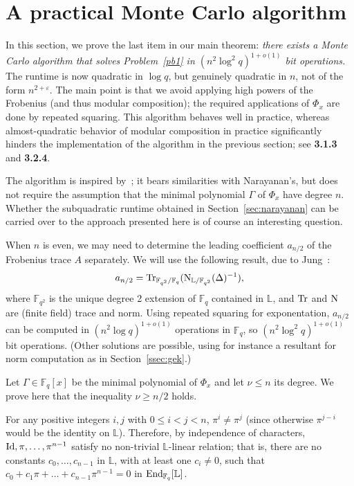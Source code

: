 \documentclass[sigconf]{acmart}
\newcommand{\F}{\mathbb{F}}
\renewcommand{\L}{\mathbb{L}}
\begin{document}

\section{A practical Monte Carlo algorithm}\label{sec:mc}

In this section, we prove the last item in our main theorem: {\em
  there exists a Monte Carlo algorithm that solves Problem~\ref{pb1}
  in $(n^2 \log^2 q)^{1+o(1)}$ bit operations.} The runtime is now
quadratic in $\log q$, but genuinely quadratic in $n$, not of the form
$n^{2+\varepsilon}$. The main point is that we avoid applying high
powers of the Frobenius (and thus modular composition); the required
applications of $\Phi_x$ are done by repeated squaring.  This
algorithm behaves well in practice, whereas almost-quadratic behavior
of modular composition in practice significantly hinders the
implementation of the algorithm in the previous section; see {\bf
  3.1.3} and {\bf 3.2.4}.

The algorithm is inspired by~\cite[Th.~5]{Shoup94}; it bears
similarities with Narayanan's, but does not require the assumption
that the minimal polynomial $\Gamma$ of $\Phi_x$ have degree
$n$. Whether the subquadratic runtime obtained in
Section~\ref{sec:narayanan} can be carried over to the approach
presented here is of course an interesting question.

\smallskip{} When $n$ is even, we may need to
determine the leading coefficient $a_{n/2}$ of the Frobenius trace $A$
separately. We will use the following result, due to
Jung~\cite{Jung00,frobdist}:
\[a_{n/2} = {\rm Tr}_{\F_{q^2}/\F_{q}}({\rm N}_{\L/\F_{q^2}}(\Delta)^{-1}),\]
where $\F_{q^2}$ is the unique degree 2 extension of $\F_q$ contained
in $\L$, and ${\rm Tr}$ and ${\rm N}$ are (finite field) trace and
norm. Using repeated squaring for exponentation, $a_{n/2}$ can be
computed in $(n^2 \log q)^{1+o(1)}$ operations in $\F_q$, so $(n^2
  \log^2 q)^{1+o(1)}$ bit operations.
(Other solutions are possible, using for instance a resultant
 for norm computation as in Section~\ref{ssec:gek}.)

\smallskip{} Let $\Gamma \in \F_q[x]$ be the minimal
polynomial of $\Phi_x$ and let $\nu \le n$ its degree. We prove here 
that the inequality $\nu\ge n/2$ holds.

For any positive integers $i,j$ with $0 \le i < j < n$, $\pi^i \ne
\pi^j$ (since otherwise $\pi^{j-i}$ would be the identity on
$\L$). Therefore, by independence of characters, ${\rm Id}, \pi,
\ldots, \pi^{n-1}$ satisfy no non-trivial $\L$-linear relation;
that is, there are no constants $c_0, \ldots, c_{n-1}$ in $\L$,
with at least one $c_i \neq 0$, such that $c_0 + c_1 \pi + \ldots +
c_{n-1}\pi^{n-1}=0$ in ${\rm End}_{\F_q}[\L]$.
\end{document}
